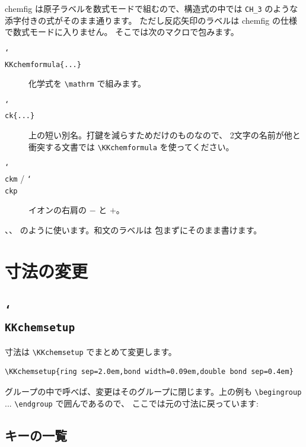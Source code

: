 \documentclass[paper=a4paper,fontsize=10pt]{jlreq}
\begin{document}
\textsf{chemfig} は原子ラベルを数式モードで組むので、構造式の中では
\verb|CH_3| のような添字付きの式がそのまま通ります。
ただし反応矢印のラベルは \textsf{chemfig} の仕様で数式モードに入りません。
そこでは次のマクロで包みます。

\begin{description}
\item[\texttt{\char`\\KKchemformula\{...\}}] 化学式を \verb|\mathrm| で組みます。
\item[\texttt{\char`\\ck\{...\}}] 上の短い別名。打鍵を減らすためだけのものなので、
      2文字の名前が他と衝突する文書では \verb|\KKchemformula| を使ってください。
\item[\texttt{\char`\\ckm} / \texttt{\char`\\ckp}] イオンの右肩の $-$ と $+$。
\end{description}

、、 のように使います。和文のラベルは
包まずにそのまま書けます。

\section{寸法の変更}

\subsection{\texttt{\char`\\KKchemsetup}}

寸法は \verb|\KKchemsetup| でまとめて変更します。

\begin{verbatim}
\KKchemsetup{ring sep=2.0em,bond width=0.09em,double bond sep=0.4em}
\end{verbatim}

\begingroup
{}
\begin{center}
\KKsalicylicacid\qquad{}
\end{center}
\endgroup

グループの中で呼べば、変更はそのグループに閉じます。上の例も
\verb|\begingroup| ... \verb|\endgroup| で囲んであるので、
ここでは元の寸法に戻っています: \KKsalicylicacid

\subsection{キーの一覧}
\end{document}
